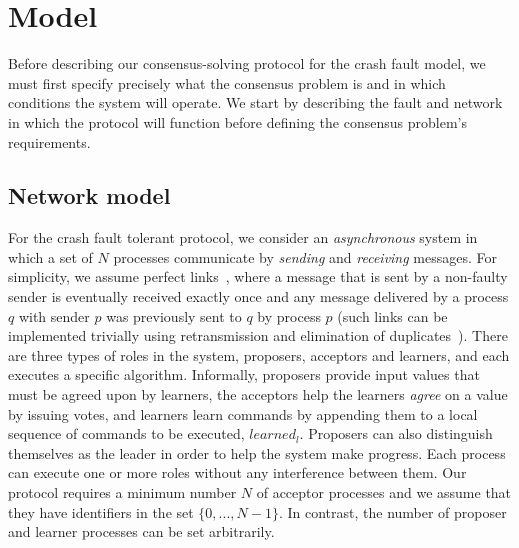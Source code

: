 \section{Model} \label{cft_model}

Before describing our consensus-solving protocol for the crash fault model, we must first specify precisely what the consensus problem is and in which conditions the system will operate. We start by describing the fault and network in which the protocol will function before defining the consensus problem's requirements.

\subsection{Network model}
For the crash fault tolerant protocol, we consider an \emph{asynchronous} system in which a set of $N$ processes communicate by \emph{sending} and \emph{receiving} messages. For simplicity, we assume perfect links~\cite{cgr:book}, where a message that is sent by a non-faulty sender is eventually received exactly once and any message delivered by a process $q$ with sender $p$ was previously sent to $q$ by process $p$ (such links can be implemented trivially using retransmission and elimination of duplicates~\cite{cgr:book}). There are three types of roles in the system, proposers, acceptors and learners, and each executes a specific algorithm. Informally, proposers provide input values that must be agreed upon by learners, the acceptors help the learners \emph{agree} on a value by issuing votes, and learners learn commands by appending them to a local sequence of commands to be executed, $learned_l$. Proposers can also distinguish themselves as the leader in order to help the system make progress. Each process can execute one or more roles without any interference between them. Our protocol requires a minimum number $N$ of acceptor processes and we assume that they have identifiers in the set $\{0,...,N-1\}$. In contrast, the number of proposer and learner processes can be set arbitrarily.

